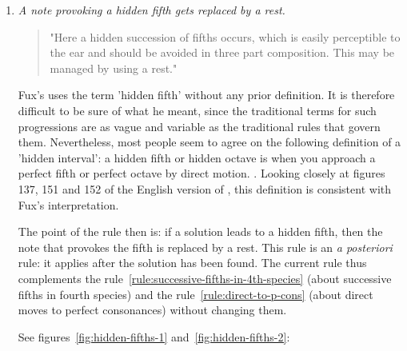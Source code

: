 \begin{enumerate}[wide, label=\bfseries 4.P\arabic*]
    \item \textit{A note provoking a hidden fifth gets replaced by a rest.} \label{rule:hidden-fifths}
    \begin{quotation}
        "Here a hidden succession of fifths occurs, which is easily perceptible to the ear and should be avoided in three part composition. This may be managed by using a rest."
        \textcite[p.98]{GaPEng}
    \end{quotation}
    Fux's uses the term 'hidden fifth' without any prior definition. It is therefore difficult to be sure of what he meant, since the traditional terms for such progressions are as vague and variable as the traditional rules that govern them. Nevertheless, most people seem to agree on the following definition of a 'hidden interval': a hidden fifth or hidden octave is when you approach a perfect fifth or perfect octave by direct motion. \cite[p.31]{piston1987harmony}. Looking closely at figures 137, 151 and 152 of the English version of \gap, this definition is consistent with Fux's interpretation.

    The point of the rule then is: if a solution leads to a hidden fifth, then the note that provokes the fifth is replaced by a rest. This rule is an \textit{a posteriori} rule: it applies after the solution has been found.
    The current rule thus complements the rule~\ref{rule:successive-fifths-in-4th-species} (about successive fifths in fourth species) and the rule~\ref{rule:direct-to-p-cons} (about direct moves to perfect consonances) without changing them.
    
    See figures~\ref{fig:hidden-fifths-1} and~\ref{fig:hidden-fifths-2}:


\end{enumerate}
